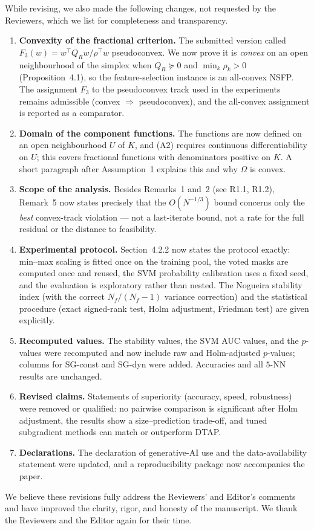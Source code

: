 \documentclass[11pt]{article}
\begin{document}
\noindent While revising, we also made the following changes, not requested by the
Reviewers, which we list for completeness and transparency.
\begin{enumerate}[leftmargin=1.6em,itemsep=3pt]
\item \textbf{Convexity of the fractional criterion.} The submitted version called
  $F_3(w)=w^{\top}Q_Rw/\rho^{\top}w$ pseudoconvex. We now prove it is \emph{convex} on an
  open neighbourhood of the simplex when $Q_R\succeq0$ and $\min_k\rho_k>0$
  (Proposition~4.1), so the feature-selection instance is an all-convex NSFP. The
  assignment $F_3$ to the pseudoconvex track used in the experiments remains admissible
  (convex $\Rightarrow$ pseudoconvex), and the all-convex assignment is reported as a
  comparator.
\item \textbf{Domain of the component functions.} The functions are now defined on an open
  neighbourhood $U$ of $K$, and (A2) requires continuous differentiability on $U$; this
  covers fractional functions with denominators positive on $K$. A short paragraph after
  Assumption~1 explains this and why $\Omega$ is convex.
\item \textbf{Scope of the analysis.} Besides Remarks~1 and~2 (see R1.1, R1.2), Remark~5
  now states precisely that the $O(N^{-1/3})$ bound concerns only the \emph{best}
  convex-track violation --- not a last-iterate bound, not a rate for the full residual or
  the distance to feasibility.
\item \textbf{Experimental protocol.} Section~4.2.2 now states the protocol exactly:
  min--max scaling is fitted once on the training pool, the voted masks are computed once
  and reused, the SVM probability calibration uses a fixed seed, and the evaluation is
  exploratory rather than nested. The Nogueira stability index (with the correct
  $N_f/(N_f-1)$ variance correction) and the statistical procedure (exact signed-rank
  test, Holm adjustment, Friedman test) are given explicitly.
\item \textbf{Recomputed values.} The stability values, the SVM AUC values, and the
  $p$-values were recomputed and now include raw and Holm-adjusted $p$-values; columns for
  SG-const and SG-dyn were added. Accuracies and all $5$-NN results are unchanged.
\item \textbf{Revised claims.} Statements of superiority (accuracy, speed, robustness)
  were removed or qualified: no pairwise comparison is significant after Holm adjustment,
  the results show a size--prediction trade-off, and tuned subgradient methods can match or
  outperform DTAP.
\item \textbf{Declarations.} The declaration of generative-AI use and the data-availability
  statement were updated, and a reproducibility package now accompanies the paper.
\end{enumerate}

\bigskip
\noindent We believe these revisions fully address the Reviewers' and Editor's comments
and have improved the clarity, rigor, and honesty of the manuscript. We thank the
Reviewers and the Editor again for their time.
\end{document}
